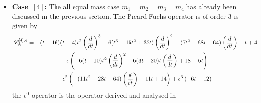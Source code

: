 \documentclass[a4paper,12pt]{article}
\numberwithin{equation}{section}
\numberwithin{figure}{subsection}
\theoremstyle{plain}
\theoremstyle{plain}
\theoremstyle{definition}
\theoremstyle{plain}
\theoremstyle{remark}
\theoremstyle{plain}
\def\su{\circleddash}
\begin{document}
\begin{itemize}
\item  {\bf Case~$[4]$:} The all equal mass case $m_1=m_2=m_3=m_4$ has already been
  discussed in the previous section. The Picard-Fuchs operator is of order 3 is given by
  \begin{multline}
    \mathscr{L}_\su^{[4],\epsilon}=
    -(t - 16)  (t - 4)  t^2\left(d\over dt\right)^3 - 6  (t^3 -
                              15  t^2 + 32  t)  \left(d\over dt\right)^2 - (7  t^2 - 68  t +
                              64)  \left(d\over dt\right) - t + 4\cr
                              +\epsilon \left(-6  (t - 10  ) t^2 \left(d\over dt\right)^2 -
      6  (3  t - 20  ) t \left(d\over dt\right) +18- 6  t 
      \right)\cr
    +\epsilon^2\left(-(11  t^2 -
      28  t - 64)  \left(d\over dt\right) - 11  t + 14\right)+ \epsilon^3\left(-6  t - 12\right)
  \end{multline}
the $\epsilon^0$ operator is the operator derived and analysed in~\cite{Vanhove:2014wqa,Bloch:2014qca,Pogel:2022yat}



\end{itemize}
\end{document}
